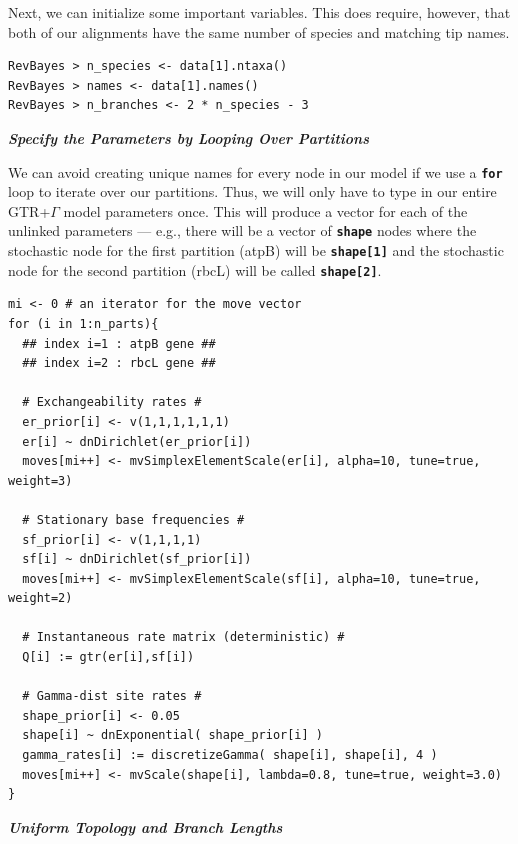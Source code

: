\documentclass[11pt]{article}
\newcommand{\cl}[1]{{\texttt{\textbf{#1}}}}
\begin{document}
Next, we can initialize some important variables. This does require, however, that both of our alignments have the same number of species and matching tip names.
{\tt \begin{snugshade*}
\begin{lstlisting}
RevBayes > n_species <- data[1].ntaxa()
RevBayes > names <- data[1].names()
RevBayes > n_branches <- 2 * n_species - 3
\end{lstlisting}
\end{snugshade*}}


\textbf{\textit{Specify the Parameters by Looping Over Partitions}}

We can avoid creating unique names for every node in our model if we use a \cl{for} loop to iterate over our partitions. Thus, we will only have to type in our entire GTR+$\Gamma$ model parameters once. 
This will produce a vector for each of the unlinked parameters --- e.g., there will be a vector of \cl{shape} nodes where the stochastic node for the first partition (atpB) will be \cl{shape[1]} and the stochastic node for the second partition (rbcL) will be called \cl{shape[2]}.
{\tt \small \begin{snugshade*}
\begin{lstlisting}
mi <- 0 # an iterator for the move vector
for (i in 1:n_parts){
  ## index i=1 : atpB gene ##
  ## index i=2 : rbcL gene ##
  
  # Exchangeability rates #
  er_prior[i] <- v(1,1,1,1,1,1)
  er[i] ~ dnDirichlet(er_prior[i])
  moves[mi++] <- mvSimplexElementScale(er[i], alpha=10, tune=true, weight=3) 

  # Stationary base frequencies #
  sf_prior[i] <- v(1,1,1,1)
  sf[i] ~ dnDirichlet(sf_prior[i])
  moves[mi++] <- mvSimplexElementScale(sf[i], alpha=10, tune=true, weight=2) 

  # Instantaneous rate matrix (deterministic) #
  Q[i] := gtr(er[i],sf[i]) 

  # Gamma-dist site rates #
  shape_prior[i] <- 0.05 
  shape[i] ~ dnExponential( shape_prior[i] )
  gamma_rates[i] := discretizeGamma( shape[i], shape[i], 4 )
  moves[mi++] <- mvScale(shape[i], lambda=0.8, tune=true, weight=3.0)
}
\end{lstlisting}
\end{snugshade*}}


\textbf{\textit{Uniform Topology and Branch Lengths}}
\end{document}
